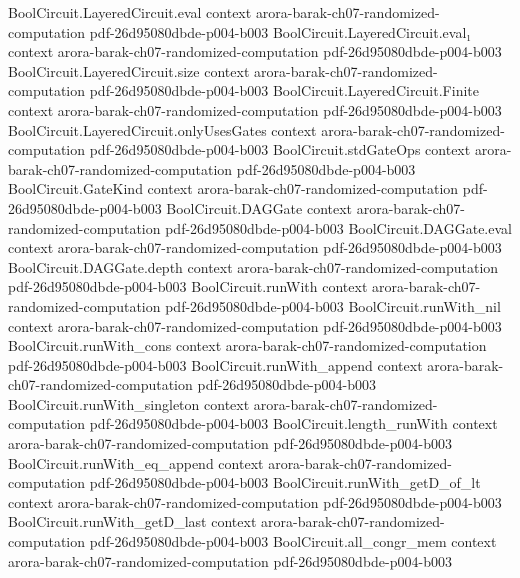 \begin{theorem}
\proofstep
  {BoolCircuit.LayeredCircuit.eval}
  {context}
  {arora-barak-ch07-randomized-computation}
  {pdf-26d95080dbde-p004-b003}
\proofstep
  {BoolCircuit.LayeredCircuit.eval₁}
  {context}
  {arora-barak-ch07-randomized-computation}
  {pdf-26d95080dbde-p004-b003}
\proofstep
  {BoolCircuit.LayeredCircuit.size}
  {context}
  {arora-barak-ch07-randomized-computation}
  {pdf-26d95080dbde-p004-b003}
\proofstep
  {BoolCircuit.LayeredCircuit.Finite}
  {context}
  {arora-barak-ch07-randomized-computation}
  {pdf-26d95080dbde-p004-b003}
\proofstep
  {BoolCircuit.LayeredCircuit.onlyUsesGates}
  {context}
  {arora-barak-ch07-randomized-computation}
  {pdf-26d95080dbde-p004-b003}
\proofstep
  {BoolCircuit.stdGateOps}
  {context}
  {arora-barak-ch07-randomized-computation}
  {pdf-26d95080dbde-p004-b003}
\proofstep
  {BoolCircuit.GateKind}
  {context}
  {arora-barak-ch07-randomized-computation}
  {pdf-26d95080dbde-p004-b003}
\proofstep
  {BoolCircuit.DAGGate}
  {context}
  {arora-barak-ch07-randomized-computation}
  {pdf-26d95080dbde-p004-b003}
\proofstep
  {BoolCircuit.DAGGate.eval}
  {context}
  {arora-barak-ch07-randomized-computation}
  {pdf-26d95080dbde-p004-b003}
\proofstep
  {BoolCircuit.DAGGate.depth}
  {context}
  {arora-barak-ch07-randomized-computation}
  {pdf-26d95080dbde-p004-b003}
\proofstep
  {BoolCircuit.runWith}
  {context}
  {arora-barak-ch07-randomized-computation}
  {pdf-26d95080dbde-p004-b003}
\proofstep
  {BoolCircuit.runWith_nil}
  {context}
  {arora-barak-ch07-randomized-computation}
  {pdf-26d95080dbde-p004-b003}
\proofstep
  {BoolCircuit.runWith_cons}
  {context}
  {arora-barak-ch07-randomized-computation}
  {pdf-26d95080dbde-p004-b003}
\proofstep
  {BoolCircuit.runWith_append}
  {context}
  {arora-barak-ch07-randomized-computation}
  {pdf-26d95080dbde-p004-b003}
\proofstep
  {BoolCircuit.runWith_singleton}
  {context}
  {arora-barak-ch07-randomized-computation}
  {pdf-26d95080dbde-p004-b003}
\proofstep
  {BoolCircuit.length_runWith}
  {context}
  {arora-barak-ch07-randomized-computation}
  {pdf-26d95080dbde-p004-b003}
\proofstep
  {BoolCircuit.runWith_eq_append}
  {context}
  {arora-barak-ch07-randomized-computation}
  {pdf-26d95080dbde-p004-b003}
\proofstep
  {BoolCircuit.runWith_getD_of_lt}
  {context}
  {arora-barak-ch07-randomized-computation}
  {pdf-26d95080dbde-p004-b003}
\proofstep
  {BoolCircuit.runWith_getD_last}
  {context}
  {arora-barak-ch07-randomized-computation}
  {pdf-26d95080dbde-p004-b003}
\proofstep
  {BoolCircuit.all_congr_mem}
  {context}
  {arora-barak-ch07-randomized-computation}
  {pdf-26d95080dbde-p004-b003}
\proofstep

\end{theorem}
